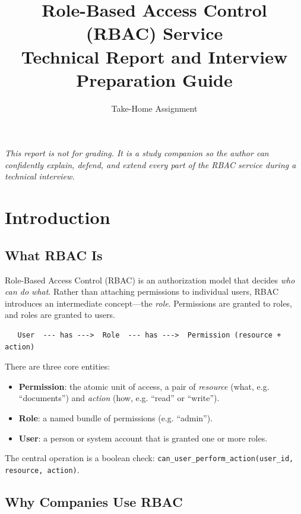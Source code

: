 \documentclass[11pt,a4paper]{report}
\title{\textbf{Role-Based Access Control (RBAC) Service}\\[6pt]
\large Technical Report and Interview Preparation Guide}
\author{Take-Home Assignment}
\date{}
\begin{document}
\maketitle

\begin{center}
\textit{This report is not for grading. It is a study companion so the author can
confidently explain, defend, and extend every part of the RBAC service during a
technical interview.}
\end{center}

\tableofcontents

\chapter{Introduction}

\section{What RBAC Is}

Role-Based Access Control (RBAC) is an authorization model that decides
\emph{who can do what}. Rather than attaching permissions to individual users,
RBAC introduces an intermediate concept---the \emph{role}. Permissions are
granted to roles, and roles are granted to users.

\begin{verbatim}
   User  --- has --->  Role  --- has --->  Permission (resource + action)
\end{verbatim}

There are three core entities:

\begin{itemize}[leftmargin=1.4em]
  \item \textbf{Permission}: the atomic unit of access, a pair of
        \emph{resource} (what, e.g. ``documents'') and \emph{action}
        (how, e.g. ``read'' or ``write'').
  \item \textbf{Role}: a named bundle of permissions (e.g. ``admin'').
  \item \textbf{User}: a person or system account that is granted one or more
        roles.
\end{itemize}

The central operation is a boolean check:
\texttt{can\_user\_perform\_action(user\_id, resource, action)}.

\section{Why Companies Use RBAC}
\end{document}
